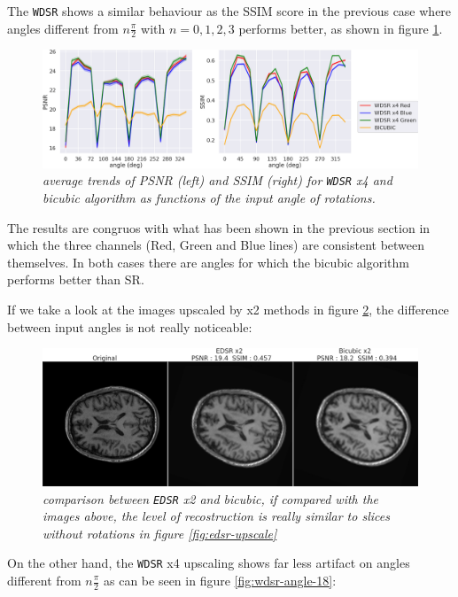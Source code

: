 \documentclass[12pt,a4paper]{report}
\begin{document}
The {\tt WDSR} shows a similar behaviour as the SSIM score in the previous case where angles different from $n \frac{\pi}{2}$ with $n = 0, 1, 2, 3$ performs better, as shown in figure \ref{fig:wdsr-angles}.   

\begin{figure}[H]
 \centering
 \includegraphics[scale=0.3]{./images/wdsr-angles.png}
 \caption{\it average trends of PSNR (left) and SSIM (right) for {\tt WDSR} x4 and bicubic algorithm as functions of the input angle of rotations.}
 \label{fig:wdsr-angles}
\end{figure}

The results are congruos with what has been shown in the previous section in which the three channels (Red, Green and Blue lines) are consistent between themselves.
In both cases there are angles for which the bicubic algorithm performs better than SR.

If we take a look at the images upscaled by x2 methods in figure \ref{fig:edsr-angle-18}, the difference between input angles is not really noticeable: 

\begin{figure}[H]
 \centering
 \includegraphics[scale=0.3]{./images/edsr_angle_18.png}
 \caption{\it comparison between {\tt EDSR} x2 and bicubic, if compared with the images above, the level of recostruction is really similar to slices without rotations in figure \ref{fig:edsr-upscale}}
 \label{fig:edsr-angle-18}
\end{figure}

On the other hand, the {\tt WDSR} x4 upscaling shows far less artifact on angles different from $n\frac{\pi}{2}$ as can be seen in figure \ref{fig:wdsr-angle-18}:
\end{document}
